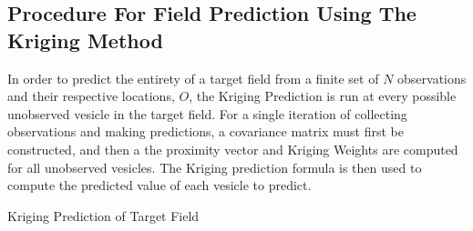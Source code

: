\subsection{Procedure For Field Prediction Using The Kriging Method}
In order to predict the entirety of a target field from a finite set of $N$ observations and their respective locations, $O$, the Kriging Prediction is run at every possible unobserved vesicle in the target field. For a single iteration of collecting observations and making predictions, a covariance matrix must first be constructed, and then a the proximity vector and Kriging Weights are computed for all unobserved vesicles. The Kriging prediction formula is then used to compute the predicted value of each vesicle to predict.

\begin{algorithm}[thpb!]
\caption{Kriging Prediction of Target Field}\label{alg:krig}
\end{algorithm}
